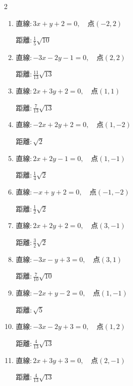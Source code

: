 \begin{multicols}{2}
\begin{enumerate}
        $\displaystyle 距離 : \sqrt{2}$

\columnbreak %

  \item $直線:3x+y+2=0,\quad 点 ( -2, 2 )$

        $\displaystyle 距離 : \frac{1}{5}\sqrt{10}$

  \item $直線:-3x-2y-1=0,\quad 点 ( 2, 2 )$

        $\displaystyle 距離 : \frac{11}{13}\sqrt{13}$

  \item $直線:2x+3y+2=0,\quad 点 ( 1, 1 )$

        $\displaystyle 距離 : \frac{7}{13}\sqrt{13}$

  \item $直線:-2x+2y+2=0,\quad 点 ( 1, -2 )$

        $\displaystyle 距離 : \sqrt{2}$

  \item $直線:2x+2y-1=0,\quad 点 ( 1, -1 )$

        $\displaystyle 距離 : \frac{1}{4}\sqrt{2}$

  \item $直線:-x+y+2=0,\quad 点 ( -1, -2 )$

        $\displaystyle 距離 : \frac{1}{2}\sqrt{2}$

  \item $直線:2x+2y+2=0,\quad 点 ( 3, -1 )$

        $\displaystyle 距離 : \frac{3}{2}\sqrt{2}$

  \item $直線:-3x-y+3=0,\quad 点 ( 3, 1 )$

        $\displaystyle 距離 : \frac{7}{10}\sqrt{10}$

  \item $直線:-2x+y-2=0,\quad 点 ( 1, -1 )$

        $\displaystyle 距離 : \sqrt{5}$

  \item $直線:-3x-2y+3=0,\quad 点 ( 1, 2 )$

        $\displaystyle 距離 : \frac{4}{13}\sqrt{13}$

\columnbreak %

\resetques

  \item $直線:2x+3y+3=0,\quad 点 ( 2, -1 )$

        $\displaystyle 距離 : \frac{4}{13}\sqrt{13}$


\end{enumerate}
\end{multicols}
